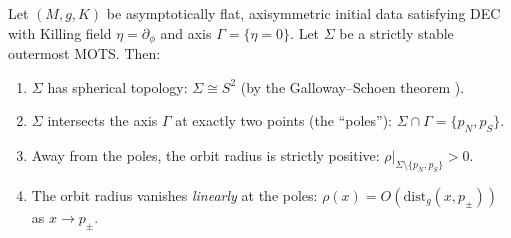 \begin{lemma}\label{lem:mots-axis}
Let $(M, g, K)$ be asymptotically flat, axisymmetric initial data satisfying DEC with Killing field $\eta = \partial_\phi$ and axis $\Gamma = \{\eta = 0\}$. Let $\Sigma$ be a strictly stable outermost MOTS. Then:
\begin{enumerate}[label=\textup{(\roman*)}]
    \item $\Sigma$ has spherical topology: $\Sigma \cong S^2$ (by the Galloway--Schoen theorem \cite{gallowayschoen2006}).
    \item $\Sigma$ intersects the axis $\Gamma$ at exactly two points (the ``poles''): $\Sigma \cap \Gamma = \{p_N, p_S\}$.
    \item Away from the poles, the orbit radius is strictly positive: $\rho|_{\Sigma \setminus \{p_N, p_S\}} > 0$.
    \item The orbit radius vanishes \emph{linearly} at the poles: $\rho(x) = O(\mathrm{dist}_g(x, p_\pm))$ as $x \to p_\pm$.
\end{enumerate}
\end{lemma}

